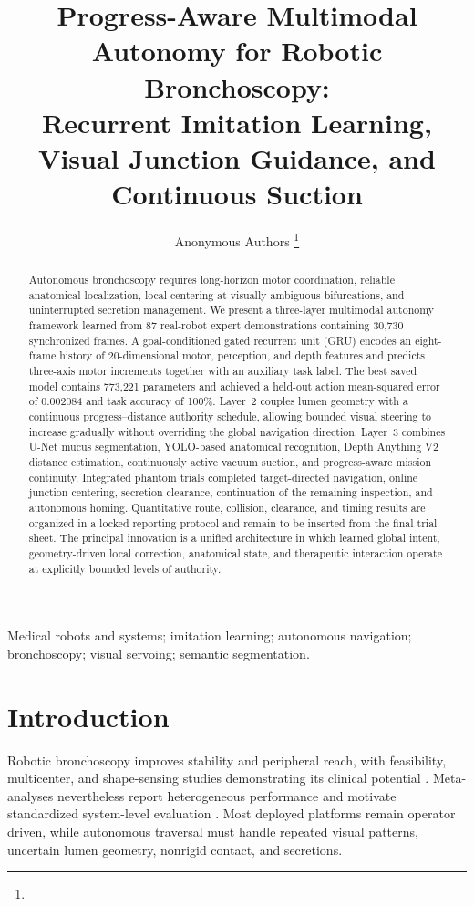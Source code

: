 \documentclass[letterpaper,10pt,conference]{ieeeconf}
\title{Progress-Aware Multimodal Autonomy for Robotic Bronchoscopy:\\
Recurrent Imitation Learning, Visual Junction Guidance, and Continuous Suction}
\author{Anonymous Authors%
\thanks{\TODO{Insert authors, affiliations, funding, and corresponding-author details.}}}
\begin{document}
\maketitle
\thispagestyle{empty}
\pagestyle{empty}

\begin{abstract}
Autonomous bronchoscopy requires long-horizon motor coordination, reliable
anatomical localization, local centering at visually ambiguous bifurcations,
and uninterrupted secretion management. We present a three-layer multimodal
autonomy framework learned from 87 real-robot expert demonstrations containing
30,730 synchronized frames. A goal-conditioned gated recurrent unit (GRU)
encodes an eight-frame history of 20-dimensional motor, perception, and depth
features and predicts three-axis motor increments together with an auxiliary
task label. The best saved model contains 773,221 parameters and achieved a
held-out action mean-squared error of 0.002084 and task accuracy of 100\%.
Layer~2 couples lumen geometry with a continuous progress--distance authority
schedule, allowing bounded visual steering to increase gradually without
overriding the global navigation direction. Layer~3 combines U-Net mucus
segmentation, YOLO-based anatomical recognition, Depth Anything V2 distance
estimation, continuously active vacuum suction, and progress-aware mission
continuity. Integrated phantom trials completed target-directed navigation,
online junction centering, secretion clearance, continuation of the remaining
inspection, and autonomous homing. Quantitative route, collision, clearance,
and timing results are organized in a locked reporting protocol and remain to
be inserted from the final trial sheet. The principal innovation is a unified
architecture in which learned global intent, geometry-driven local correction,
anatomical state, and therapeutic interaction operate at explicitly bounded
levels of authority.
\end{abstract}

\begin{keywords}
Medical robots and systems; imitation learning; autonomous navigation;
bronchoscopy; visual servoing; semantic segmentation.
\end{keywords}

\section{Introduction}

Robotic bronchoscopy improves stability and peripheral reach, with feasibility,
multicenter, and shape-sensing studies demonstrating its clinical potential
\cite{fielding2019firsthuman,chaddha2019multicenter,rojassolano2018feasibility,
chen2021benefit,kalchiem2022shapesensing}. Meta-analyses nevertheless report
heterogeneous performance and motivate standardized system-level evaluation
\cite{ali2023metaanalysis,zhang2024metaanalysis}. Most deployed platforms
remain operator driven, while autonomous traversal must handle repeated visual
patterns, uncertain lumen geometry, nonrigid contact, and secretions.
\end{document}
